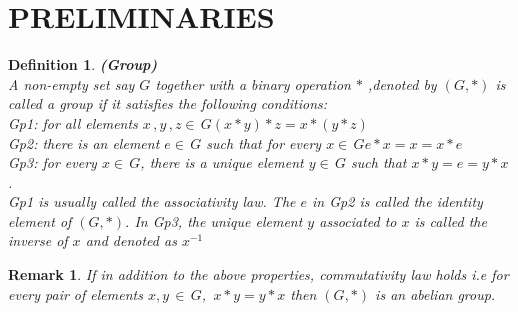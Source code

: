 \documentclass[a4paper, 12pt, openany]{report}
\newtheorem{rmk}{Remark}[section]
\newtheorem{defn}{Definition}[section]
\newtheorem{ex}{Example}[section]
\begin{document}
	\section{PRELIMINARIES}
	\begin{defn}\textbf{(Group)}\\A non-empty set say $G$ together with a binary operation $*$ ,denoted by $(G,*)$ is  called a group if it satisfies the following conditions:\\
		Gp1: for all elements $x\,,y\,,z\in\,G$\quad  $(x * y) * z = x *(y * z)$\\
		Gp2: there is an element $e \in\, G$ such that for every $x \in\,G$\quad $e*x= x = x *e$\\
		Gp3: for every  $x \in\,G$, there is a unique element  $y\in\,G$  such that \break $x*y=e=y*x$.\\
		Gp1 is usually called the associativity law. The $e$ in Gp2 is  called the identity element of $(G,*)$. In	Gp3, the unique element $y$ associated to $x$ is called the inverse of $x$ and denoted as $x^{-1}$\end{defn}
	\begin{rmk} If in addition to the above properties, commutativity law holds i.e for every pair of elements $x,y\,\in\,G$,\, $x*y=y*x$ then  $(G,*)$ is an abelian group.\end{rmk}
		
\end{document}
